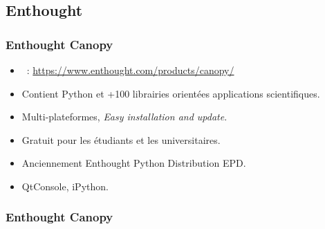 \subsection{Enthought}
\begin{frame}
\frametitle{Enthought Canopy}
\begin{itemize}
 \item {}\ : \url{https://www.enthought.com/products/canopy/}
 \item Contient Python et +100 librairies orientées applications scientifiques. 
 \item Multi-plateformes, \emph{Easy installation and update}.
 \item Gratuit pour les étudiants et les universitaires. 
 \item Anciennement Enthought Python Distribution EPD. 
 \item QtConsole, iPython. 
\end{itemize}
\end{frame}
\begin{frame}
\frametitle{Enthought Canopy}
\begin{center}
\end{center}
\end{frame}
